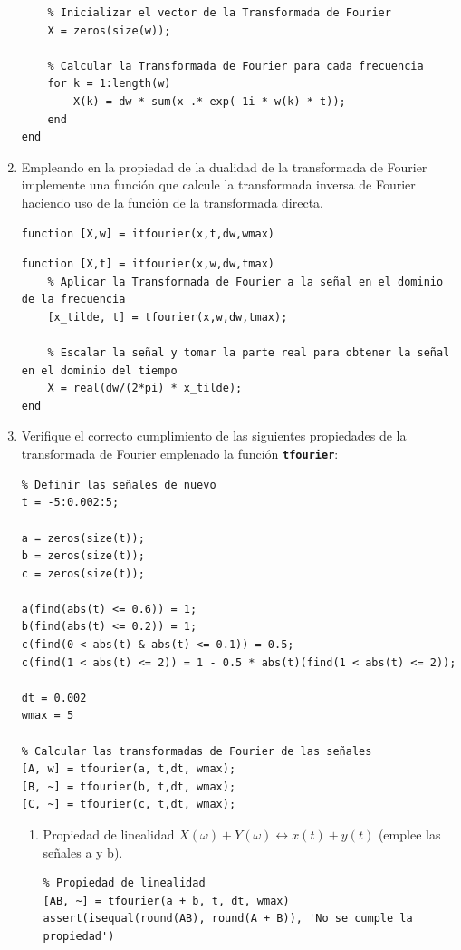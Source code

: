 \documentclass{article}
\newcommand{\code}[1]{\texttt{\textbf{#1}}}
\begin{document}
\begin{enumerate}[leftmargin=*]
\begin{lstlisting}
    % Inicializar el vector de la Transformada de Fourier
    X = zeros(size(w));

    % Calcular la Transformada de Fourier para cada frecuencia
    for k = 1:length(w)
        X(k) = dw * sum(x .* exp(-1i * w(k) * t));
    end
end
\end{lstlisting}
\item Empleando en la propiedad de la dualidad de la transformada de Fourier implemente una función que calcule la transformada inversa de Fourier haciendo uso de la función de la transformada directa.
\begin{lstlisting}
function [X,w] = itfourier(x,t,dw,wmax)
\end{lstlisting}


\begin{lstlisting}
function [X,t] = itfourier(x,w,dw,tmax)
    % Aplicar la Transformada de Fourier a la señal en el dominio de la frecuencia
    [x_tilde, t] = tfourier(x,w,dw,tmax);

    % Escalar la señal y tomar la parte real para obtener la señal en el dominio del tiempo
    X = real(dw/(2*pi) * x_tilde);
end
\end{lstlisting}

\item Verifique el correcto cumplimiento de las siguientes propiedades de la transformada de Fourier emplenado la función \code{tfourier}:

\begin{lstlisting}
% Definir las señales de nuevo
t = -5:0.002:5;

a = zeros(size(t));
b = zeros(size(t));
c = zeros(size(t));

a(find(abs(t) <= 0.6)) = 1;
b(find(abs(t) <= 0.2)) = 1;
c(find(0 < abs(t) & abs(t) <= 0.1)) = 0.5;
c(find(1 < abs(t) <= 2)) = 1 - 0.5 * abs(t)(find(1 < abs(t) <= 2));

dt = 0.002
wmax = 5

% Calcular las transformadas de Fourier de las señales
[A, w] = tfourier(a, t,dt, wmax);
[B, ~] = tfourier(b, t,dt, wmax);
[C, ~] = tfourier(c, t,dt, wmax);
\end{lstlisting}
\begin{enumerate}[label=\roman*)]
\item Propiedad de linealidad $X(\omega)+Y(\omega)\longleftrightarrow x(t)+y(t)$ (emplee las señales a y b).

\begin{lstlisting}
% Propiedad de linealidad
[AB, ~] = tfourier(a + b, t, dt, wmax)
assert(isequal(round(AB), round(A + B)), 'No se cumple la propiedad')
\end{lstlisting}


\end{enumerate}
\end{enumerate}
\end{document}
